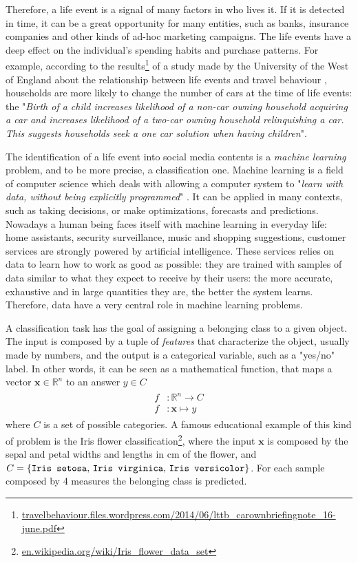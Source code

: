 Therefore, a life event is a signal of many factors in who lives it. If it is detected in time, it can be a great opportunity for many entities, such as banks, insurance companies and other kinds of ad-hoc marketing campaigns. The life events have a deep effect on the individual's spending habits and purchase patterns. For example, according to the results\footnote{\url{travelbehaviour.files.wordpress.com/2014/06/lttb_carownbriefingnote_16-june.pdf}} of a study made by the University of the West of England about the relationship between life events and travel behaviour \cite{chatterjee2015facts}, households are more likely to change the number of cars at the time of life events: the "\textit{Birth of a child increases likelihood of a non-car owning household acquiring a car and increases likelihood of a two-car owning household relinquishing a car. This suggests households seek a one car solution when having children}".

The identification of a life event into social media contents is a \emph{machine learning} problem, and to be more precise, a classification one. Machine learning is a field of computer science which deals with allowing a computer system to "\textit{learn with data, without being explicitly programmed}" \cite{samuel1959some}. It can be applied in many contexts, such as taking decisions, or make optimizations, forecasts and predictions. Nowadays a human being faces itself with machine learning in everyday life: home assistants, security surveillance, music and shopping suggestions, customer services are strongly powered by artificial intelligence. These services relies on data to learn how to work as good as possible: they are trained with samples of data similar to what they expect to receive by their users: the more accurate, exhaustive and in large quantities they are, the better the system learns. Therefore, data have a very central role in machine learning problems.

A classification task has the goal of assigning a belonging class to a given object. The input is composed by a tuple of \emph{features} that characterize the object, usually made by numbers, and the output is a categorical variable, such as a "yes/no" label. In other words, it can be seen as a mathematical function, that maps a vector $ \boldsymbol{x} \in \mathbb{R}^n $ to an answer $ y \in C $
\begin{gather*}
\begin{split}
f & \colon \mathbb{R}^n \to C \\
f & \colon \boldsymbol{x} \mapsto y
\end{split}
\end{gather*}
where $C$ is a set of possible categories. A famous educational example of this kind of problem is the Iris flower classification\footnote{\url{en.wikipedia.org/wiki/Iris_flower_data_set}}, where the input $ \boldsymbol{x} $ is composed by the sepal and petal widths and lengths in cm of the flower, and $C = \{\text{\texttt{Iris setosa}, \texttt{Iris virginica}, \texttt{Iris versicolor}}\}$. For each sample composed by 4 measures the belonging class is predicted.

